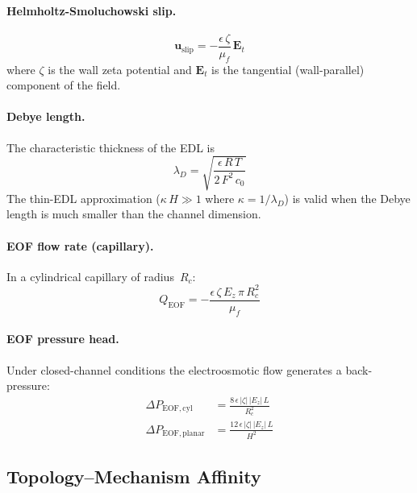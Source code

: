 \documentclass[11pt,a4paper]{article}
\begin{document}
\paragraph{Helmholtz-Smoluchowski slip.}
\begin{equation}\label{eq:eof_slip}
  \bm{u}_{\mathrm{slip}} = -\frac{\epsilon\,\zeta}{\mu_f}\,\bm{E}_t
\end{equation}
where $\zeta$ is the wall zeta potential and $\bm{E}_t$ is the
tangential (wall-parallel) component of the field.

\paragraph{Debye length.}
The characteristic thickness of the EDL is
\begin{equation}\label{eq:debye}
  \lambda_D = \sqrt{\frac{\epsilon\,R\,T}{2\,F^2\,c_0}}
\end{equation}
The thin-EDL approximation ($\kappa\,H \gg 1$ where $\kappa = 1/\lambda_D$)
is valid when the Debye length is much smaller than the channel dimension.

\paragraph{EOF flow rate (capillary).}
In a cylindrical capillary of radius~$R_c$:
\begin{equation}\label{eq:Q_eof}
  Q_{\mathrm{EOF}} = -\frac{\epsilon\,\zeta\,E_z\,\pi\,R_c^2}{\mu_f}
\end{equation}

\paragraph{EOF pressure head.}
Under closed-channel conditions the electroosmotic flow generates a
back-pressure:
\begin{align}
  \Delta P_{\mathrm{EOF,cyl}}    &= \frac{8\,\epsilon\,|\zeta|\,|E_z|\,L}{R_c^2}
    \label{eq:dP_eof_cyl} \\
  \Delta P_{\mathrm{EOF,planar}} &= \frac{12\,\epsilon\,|\zeta|\,|E_z|\,L}{H^2}
    \label{eq:dP_eof_planar}
\end{align}

\subsection{Topology--Mechanism Affinity}
\end{document}
